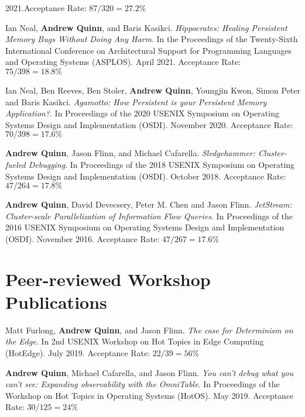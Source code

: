 \documentclass[letterpaper,10pt]{article}
\newcommand{\paper}[3]{#1. #2 #3}
\begin{document}
\begin{smenumerate}
{    2021.}{Acceptance Rate: $87/320=27.2\%$}
  \item \paper{Ian Neal, \textbf{Andrew Quinn}, and Baris
    Kasikci}{\emph{Hippocrates: Healing Persistent Memory Bugs Without
    Doing Any Harm}. In the Proceedings of the Twenty-Sixth
    International Conference on Architectural Support for Programming
    Languages and Operating Systems (ASPLOS). April 2021.}{Acceptance
    Rate: $75/398=18.8\%$}
  \item \paper{Ian Neal, Ben Reeves, Ben Stoler, \textbf{Andrew Quinn}, Youngjin Kwon,
    Simon Peter and Baris Kasikci}{\emph{Agamotto: How Persistent is your
    Persistent Memory Application?}.  In Proceedings of the 2020 USENIX
    Symposium on Operating Systems Design and Implementation (OSDI).  November
    2020.}{Acceptance Rate: $70/398=17.6\%$}
  \item \paper{\textbf{Andrew Quinn}, Jason Flinn, and Michael Cafarella}{
    \emph{Sledgehammer: Cluster-fueled Debugging}.  In Proceedings of the 2018
    USENIX Symposium on Operating Systems Design and Implementation (OSDI).
    October 2018.}{Acceptance Rate: $47/264 = 17.8\%$}
  \item \paper{\textbf{Andrew Quinn}, David Devecsery, Peter M. Chen and Jason
    Flinn}{\emph{JetStream: Cluster-scale Parallelization of Information
    Flow Queries}.  In Proceedings of the 2016 USENIX Symposium on
    Operating Systems Design and Implementation (OSDI). November
    2016.}{Acceptance Rate: $47/267=17.6\%$}
\end{smenumerate}

\section{Peer-reviewed Workshop Publications}
\begin{smenumerate}
  \item \paper{Matt Furlong, \textbf{Andrew Quinn}, and Jason Flinn}
    {\emph{The case for Determinism on the Edge}.  In 2nd USENIX
      Workshop on Hot Topics in Edge Computing (HotEdge).  July
      2019.}{Acceptance Rate: $22/39=56\%$}
  \item \paper{\textbf{Andrew Quinn}, Michael Cafarella, and Jason
    Flinn}{\emph{You can't debug what you can't see: Expanding
    observability with the OmniTable}. In Proceedings of the Workshop
    on Hot Topics in Operating Systems (HotOS).  May 2019.}{Acceptance
    Rate: $30/125=24\%$}
\end{smenumerate}
\end{document}
